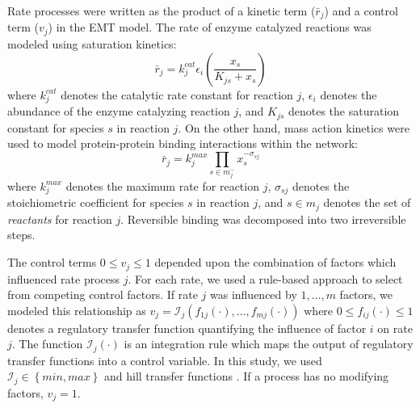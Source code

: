 \documentclass[12pt]{article}
\begin{document}
Rate processes were written as the product of a kinetic term ($\bar{r}_{j}$) and a control term ($v_{j}$) in the EMT model.
The rate of enzyme catalyzed reactions was modeled using saturation kinetics:
\begin{equation}\label{eqn:rate-saturation}
	\bar{r}_{j} = k_{j}^{cat}\epsilon_{i}\left(\frac{x_{s}}{K_{js} + x_{s}}\right)
\end{equation}
where $k_{j}^{cat}$ denotes the catalytic rate constant for reaction $j$, $\epsilon_{i}$ denotes the abundance of the enzyme catalyzing reaction $j$,
and $K_{js}$ denotes the saturation constant for species $s$ in reaction $j$.
On the other hand, mass action kinetics were used to model protein-protein binding interactions within the network:
\begin{equation}\label{eqn:rate-action}
	\bar{r}_{j} = k_{j}^{max}\prod_{s\in{m_{j}^{-}}}x_{s}^{-\sigma_{sj}}
\end{equation}
where $k_{j}^{max}$ denotes the maximum rate for reaction $j$, $\sigma_{sj}$ denotes the stoichiometric coefficient for species $s$ in reaction $j$,
and $s\in{m_{j}}$ denotes the set of \textit{reactants} for reaction $j$. Reversible binding was decomposed into two irreversible steps.


The control terms $0\leq v_{j}\leq 1$ depended upon the combination of factors which influenced rate process $j$.
For each rate, we used a rule-based approach to select from competing control factors.
If rate $j$ was influenced by $1,\dots,m$ factors, we modeled this relationship as
$v_{j}=\mathcal{I}_{j}\left(f_{1j}\left(\cdot\right),\hdots,f_{mj}\left(\cdot\right)\right)$
where $0\leq f_{ij}\left(\cdot\right)\leq 1$ denotes a regulatory transfer function quantifying the influence of factor $i$ on rate $j$.
The function $\mathcal{I}_{j}\left(\cdot\right)$ is an integration rule which maps the output of regulatory transfer functions into a control
variable. In this study, we used $\mathcal{I}_{j}\in\left\{min,max\right\}$ and hill transfer functions \citep{pr3010178,pr3010138}.
If a process has no modifying factors, $v_{j}=1$.
\end{document}
